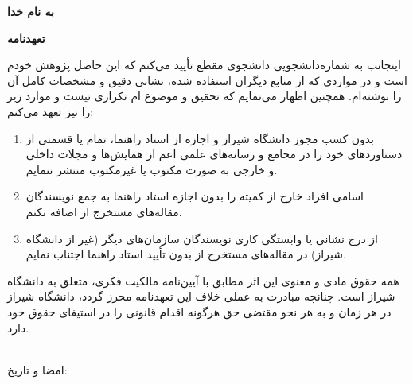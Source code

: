\begin{center}
    \textbf{به نام خدا}
    \vspace{5mm}
    
    \textbf{تعهدنامه}
    \vspace{5mm}
\end{center}

\noindent
اینجانب {\authorFA} به شماره‌دانشجویی {\studentnumber} دانشجوی مقطع {\levelFA} تأیید می‌کنم که این {\typeFA} حاصل پژوهش خودم است و در مواردی که از منابع دیگران استفاده شده، نشانی دقیق و مشخصات کامل آن را نوشته‌ام. همچنین اظهار می‌نمایم که تحقیق و موضوع {\typeFA}‌ام تکراری نیست و موارد زیر را نیز تعهد می‌کنم: 

\begin{enumerate}
    \item بدون کسب مجوز دانشگاه شیراز و اجازه از استاد راهنما، تمام یا قسمتی از دستاوردهای {\typeFA}  خود را در مجامع و رسانه‌های علمی اعم از همایش‌ها و مجلات داخلی و خارجی به صورت مکتوب یا غیرمکتوب منتشر ننمایم. 
    \item اسامی افراد خارج از کمیته {\typeFA} را بدون اجازه استاد راهنما به جمع نویسندگان مقاله‌های مستخرج از {\typeFA} اضافه نکنم. 
    \item از درج نشانی یا وابستگی کاری  نویسندگان سازمان‌های دیگر (غیر از دانشگاه شیراز) در مقاله‌های مستخرج از {\typeFA} بدون تأیید استاد راهنما اجتناب نمایم.
\end{enumerate}

همه حقوق مادی و معنوی این اثر مطابق با آیین‌نامه مالکیت فکری، متعلق به دانشگاه شیراز است. چنانچه مبادرت به عملی خلاف این تعهدنامه محرز گردد، دانشگاه شیراز در هر زمان و به هر نحو مقتضی حق هرگونه اقدام قانونی را در استیفای حقوق خود دارد.

\vspace{5mm}
\begin{center}
    {\authorFA} \\ امضا و تاریخ:
\end{center}